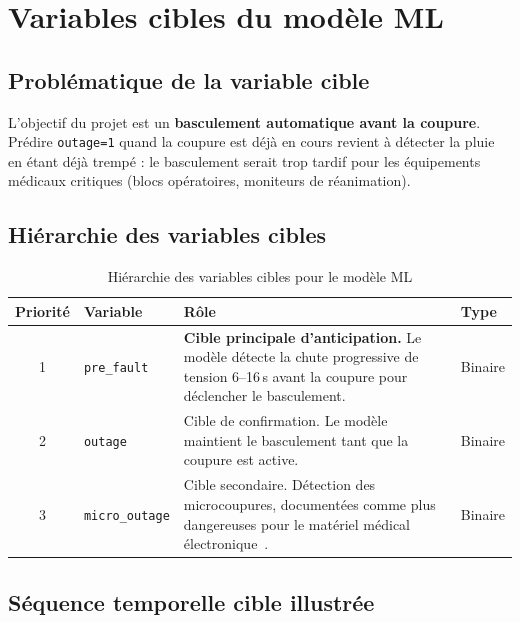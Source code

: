 \documentclass[12pt,a4paper]{article}
\begin{document}
\section{Variables cibles du modèle ML}

\subsection{Problématique de la variable cible}

L'objectif du projet est un \textbf{basculement automatique avant la coupure}.
Prédire \texttt{outage=1} quand la coupure est déjà en cours revient à détecter
la pluie en étant déjà trempé : le basculement serait trop tardif pour les équipements
médicaux critiques (blocs opératoires, moniteurs de réanimation).

\subsection{Hiérarchie des variables cibles}

\begin{table}[h]
\centering
\begin{tabular}{@{}clp{6cm}l@{}}
\toprule
Priorité & Variable & Rôle & Type \\
\midrule
1 & \texttt{pre\_fault}    & \textbf{Cible principale d'anticipation.}
                              Le modèle détecte la chute progressive de tension
                              6–16\,s avant la coupure pour déclencher le basculement. & Binaire \\
2 & \texttt{outage}        & Cible de confirmation. Le modèle maintient le
                              basculement tant que la coupure est active. & Binaire \\
3 & \texttt{micro\_outage} & Cible secondaire. Détection des microcoupures,
                              documentées comme plus dangereuses pour le matériel
                              médical électronique~\cite{moukengue}. & Binaire \\
\bottomrule
\end{tabular}
\caption{Hiérarchie des variables cibles pour le modèle ML}
\end{table}

\subsection{Séquence temporelle cible illustrée}
\end{document}
